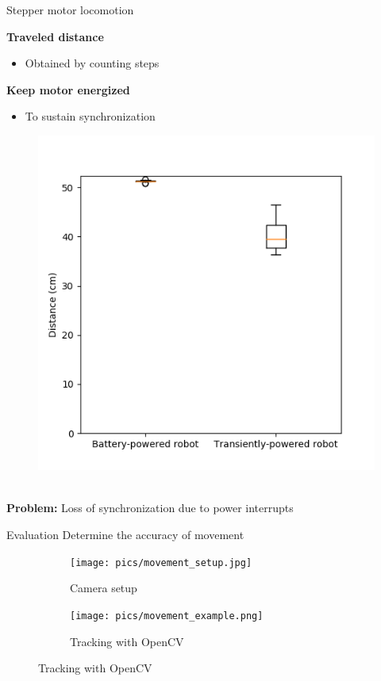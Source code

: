 \documentclass{beamer}
\begin{document}
\begin{frame}{Stepper motor locomotion}
	\begin{minipage}{0.45\textwidth}
		\textbf{Traveled distance}
		\begin{itemize}
			\item Obtained by counting steps
		\end{itemize}
		\vspace{1em}
		\textbf{Keep motor energized}
		\begin{itemize}
			\item To sustain synchronization
		\end{itemize}

	\end{minipage}
	\begin{minipage}{0.54\textwidth}\raggedleft
		\begin{figure}
			\includegraphics[width=\textwidth]{pics/stepper_motor_figure_magnitude_experiment.png}
		\end{figure}
	\end{minipage}\\
	\pause
	\textbf{Problem:} Loss of synchronization due to power interrupts
\end{frame}


\begin{frame}{Evaluation}
	Determine the accuracy of movement
	\vspace{1em}
	\begin{figure}
		\centering
		\begin{subfigure}[b]{0.45\textwidth}
			\texttt{[image: pics/movement\_setup.jpg]}
			\caption*{Camera setup}
		\end{subfigure}
		\quad
		\begin{subfigure}[b]{0.45\textwidth}
			\texttt{[image: pics/movement\_example.png]}
			\caption*{Tracking with OpenCV}
		\end{subfigure}
	\end{figure}
\end{frame}
\end{document}
